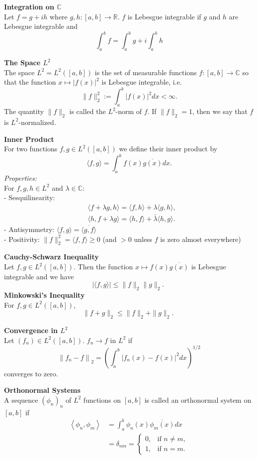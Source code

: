 \documentclass[a4paper, 10pt]{article}
\begin{document}
\begin{multicols*}{3}
\textbf{Integration on $\mathbb{C}$}\\
Let $f=g+i h$ where $g, h:[a, b] \rightarrow \mathbb{R}$. $f$ is Lebesgue integrable if $g$ and $h$ are Lebesgue integrable and 
$$
\int_a^b f=\int_a^b g+i \int_a^b h
$$

\textbf{The Space $L^2$}\\
The space $L^2=L^2([a, b])$ is the set of measurable functions $f:[a, b] \rightarrow \mathbb{C}$ so that the function $x \mapsto|f(x)|^2$ is Lebesgue integrable, i.e.
$$
\|f\|_2^2:=\int_a^b|f(x)|^2 d x<\infty .
$$
The quantity $\|f\|_2$ is called the $L^2$-norm of $f$. If $\|f\|_2=1$, then we say that $f$ is $L^2$-normalized.

\textbf{Inner Product}\\
For two functions $f, g \in L^2([a, b])$ we define their inner product by
$$
\langle f, g\rangle=\int_a^b f(x) \overline{g(x)} d x .
$$
\textit{Properties:}\\
For $f, g, h \in L^2$ and $\lambda \in \mathbb{C}$:\\
- Sesquilinearity:
$$
\begin{aligned}
& \langle f+\lambda g, h\rangle=\langle f, h\rangle+\lambda\langle g, h\rangle, \\
& \langle h, f+\lambda g\rangle=\langle h, f\rangle+\bar{\lambda}\langle h, g\rangle .
\end{aligned}
$$
- Antisymmetry: $\langle f, g\rangle=\overline{\langle g, f\rangle}$\\
- Positivity: $\|f\|_2^2=\langle f, f\rangle \geq 0$ (and $>0$ unless $f$ is zero almost everywhere)


\textbf{Cauchy-Schwarz Inequality}\\
Let $f, g \in L^2([a, b])$. Then the function $x \mapsto f(x) \overline{g(x)}$ is Lebesgue integrable and we have
$$
|\langle f, g\rangle| \leq\|f\|_2\|g\|_2 \text {. }
$$
\textbf{Minkowski’s Inequality}\\
For $f, g \in L^2([a, b])$,
$$
\|f+g\|_2 \leq\|f\|_2+\|g\|_2 \text {. }
$$

\textbf{Convergence in $L^2$}\\
Let $(f_n)\in L^2([a, b])$. 
$f_n \rightarrow f$ in $L^2$ if 
$$
\left\|f_n-f\right\|_2=\left(\int_a^b\left|f_n(x)-f(x)\right|^2 d x\right)^{1 / 2}
$$
converges to zero. 

\textbf{Orthonormal Systems}\\
A sequence $\left(\phi_n\right)_n$ of $L^2$ functions on $[a, b]$ is called an orthonormal system on $[a, b]$ if
\begin{align*}
\left\langle\phi_n, \phi_m\right\rangle &= \int_a^b \phi_n(x) \overline{\phi_m(x)} d x \\
&=\delta_{nm}= \begin{cases}
0, & \text{if } n \neq m, \\
1, & \text{if } n=m .
\end{cases}
\end{align*}


\end{multicols*}
\end{document}
